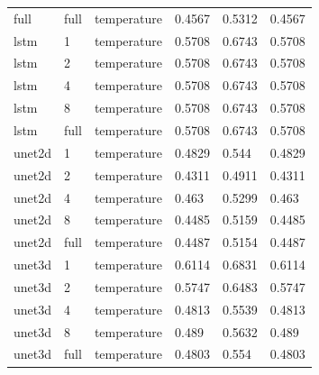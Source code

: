 \begin{table}[htbp]
\begin{tabular}{llllll}
full & full & temperature & 0.4567 & 0.5312 & 0.4567 \\
lstm & 1 & temperature & 0.5708 & 0.6743 & 0.5708 \\
lstm & 2 & temperature & 0.5708 & 0.6743 & 0.5708 \\
lstm & 4 & temperature & 0.5708 & 0.6743 & 0.5708 \\
lstm & 8 & temperature & 0.5708 & 0.6743 & 0.5708 \\
lstm & full & temperature & 0.5708 & 0.6743 & 0.5708 \\
unet2d & 1 & temperature & 0.4829 & 0.544 & 0.4829 \\
unet2d & 2 & temperature & 0.4311 & 0.4911 & 0.4311 \\
unet2d & 4 & temperature & 0.463 & 0.5299 & 0.463 \\
unet2d & 8 & temperature & 0.4485 & 0.5159 & 0.4485 \\
unet2d & full & temperature & 0.4487 & 0.5154 & 0.4487 \\
unet3d & 1 & temperature & 0.6114 & 0.6831 & 0.6114 \\
unet3d & 2 & temperature & 0.5747 & 0.6483 & 0.5747 \\
unet3d & 4 & temperature & 0.4813 & 0.5539 & 0.4813 \\
unet3d & 8 & temperature & 0.489 & 0.5632 & 0.489 \\
unet3d & full & temperature & 0.4803 & 0.554 & 0.4803 \\
\bottomrule
\end{tabular}
\end{table}

